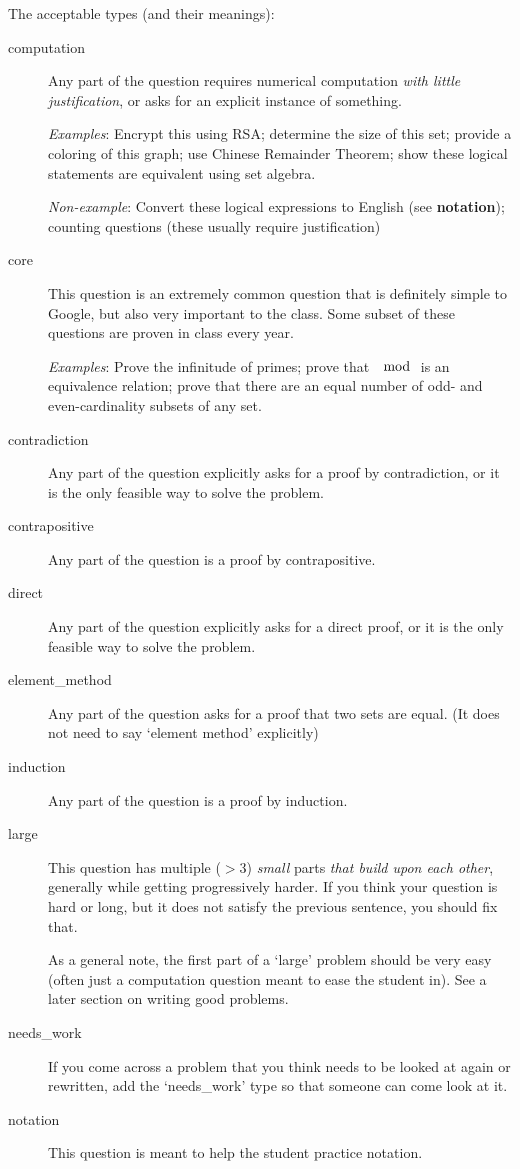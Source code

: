{    The acceptable types (and their meanings):
    \begin{description}
      \item[computation] Any part of the question requires numerical computation \textit{with little justification}, or asks for an explicit instance of something.
      
      \textit{Examples}: Encrypt this using RSA; determine the size of this set; provide a coloring of this graph; use Chinese Remainder Theorem; show these logical statements are equivalent using set algebra.
      
      \textit{Non-example}: Convert these logical expressions to English (see \textbf{notation}); counting questions (these usually require justification)
      \item[core] This question is an extremely common question that is definitely simple to Google, but also very important to the class. Some subset of these questions are proven in class every year.
      
      \textit{Examples}: Prove the infinitude of primes; prove that $\mod$ is an equivalence relation; prove that there are an equal number of odd- and even-cardinality subsets of any set.
      \item[contradiction] Any part of the question explicitly asks for a proof by contradiction, or it is the only feasible way to solve the problem.
      \item[contrapositive] Any part of the question is a proof by contrapositive.
      \item[direct] Any part of the question explicitly asks for a direct proof, or it is the only feasible way to solve the problem.
      \item[element\_method] Any part of the question asks for a proof that two sets are equal. (It does not need to say `element method' explicitly)
      \item[induction] Any part of the question is a proof by induction.
      \item[large] This question has multiple ($>3$) \textit{small} parts \textit{that build upon each other}, generally while getting progressively harder. If you think your question is hard or long, but it does not satisfy the previous sentence, you should fix that.
      
      As a general note, the first part of a `large' problem should be very easy (often just a computation question meant to ease the student in). See a later section on writing good problems.
      \item[needs\_work] If you come across a problem that you think needs to be looked at again or rewritten, add the `needs\_work' type so that someone can come look at it. 
      \item[notation] This question is meant to help the student practice notation.
      

\end{description}}
